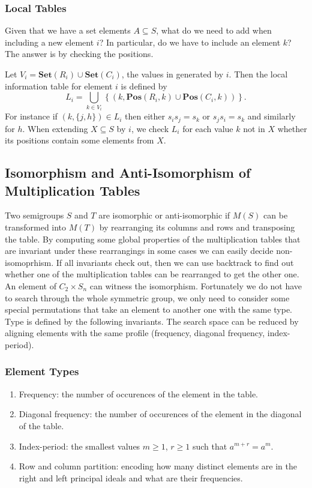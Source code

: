 \documentclass{amsart}
\newcommand{\Set}{\mathbf{Set}}
\newcommand{\Pos}{\mathbf{Pos}}
\theoremstyle{plain}
\theoremstyle{definition}
\begin{document}
\subsubsection{Local Tables} Given that we have a set elements $A\subseteq S$, what do we need to add when including a new element $i$?
In particular, do we have to include an element $k$? The answer is by checking the positions. 

Let $V_i=\Set(R_i)\cup\Set(C_i)$, the values in generated by $i$. Then the  local information table for element $i$ is defined by
$$L_i=\bigcup_{k\in V_i}\left\{(k,\Pos(R_i,k)\cup\Pos(C_i,k))\right\}.$$
For instance if $(k,\{j,h\})\in L_i$ then either $s_is_j=s_k$ or $s_js_i=s_k$ and similarly for $h$.
When  extending $X\subseteq S$ by $i$, we check $L_i$ for each value $k$ not in $X$ whether its positions contain some elements from $X$. 
\subsection{Isomorphism and Anti-Isomorphism of Multiplication Tables}
Two semigroups $S$ and $T$ are isomorphic or anti-isomorphic if $M(S)$ can be transformed into $M(T)$ by rearranging its columns and rows and transposing the table.
By computing some global properties of the multiplication tables that are invariant under these rearrangings in some cases we can easily decide non-isomoprhism.
If all invariants check out, then we can use backtrack to find out whether one of the multiplication tables can be rearranged to get the other one.
An element of $C_2\times S_n$ can witness the isomorphism.
Fortunately we do not have to search through the whole symmetric group, we only need to consider some special permutations that take an element to another one with the same type.
Type is defined by the following invariants.
The search space can be reduced by aligning elements with the same profile (frequency, diagonal frequency, index-period).

\subsubsection{Element Types}

\begin{enumerate}
\item Frequency: the number of occurences of the element in the table.
\item Diagonal frequency: the number of occurences of the element in the diagonal of the table.
\item Index-period: the smallest values $m\geq 1$, $r\geq 1$ such that $a^{m+r}=a^m$.
\item Row and column partition: encoding how many distinct elements are in the right and left principal ideals and what are their frequencies.
\end{enumerate} 
\end{document}

